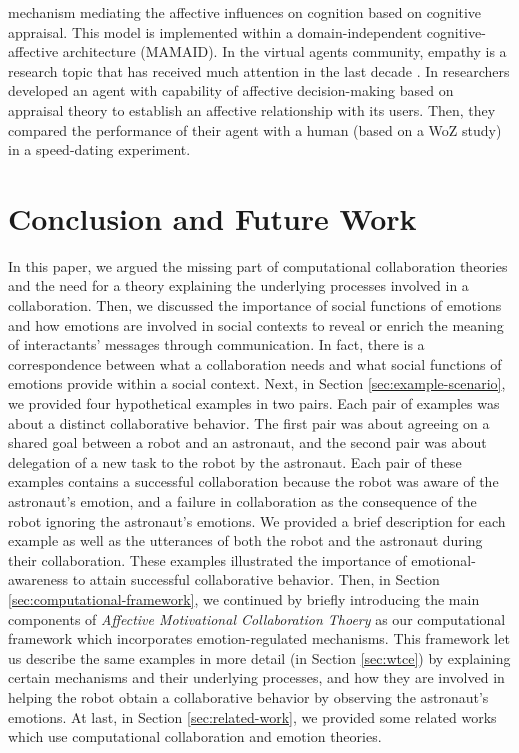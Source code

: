 mechanism mediating the affective influences on cognition based on cognitive
appraisal. This model is implemented within a domain-independent
cognitive-affective architecture (MAMAID). In the virtual agents community,
empathy is a research topic that has received much attention in the last decade
\cite{brave:emotion-hci} \cite{scott:modeling-empathy-agent}
\cite{paiva:agent-care} \cite{prendinger:empathic-companion}
\cite{bickmore:longterm-relationship}. In \cite{pontier:women-robot-men}
researchers developed an agent with capability of affective decision-making
based on appraisal theory to establish an affective relationship with its users.
Then, they compared the performance of their agent with a human (based on a WoZ
study) in a speed-dating experiment.

\section{Conclusion and Future Work}

In this paper, we argued the missing part of computational collaboration
theories and the need for a theory explaining the underlying processes involved
in a collaboration. Then, we discussed the importance of social functions of
emotions and how emotions are involved in social contexts to reveal or enrich
the meaning of interactants' messages through communication. In fact, there is a
correspondence between what a collaboration needs and what social functions of
emotions provide within a social context. Next, in Section
\ref{sec:example-scenario}, we provided four hypothetical examples in two pairs.
Each pair of examples was about a distinct collaborative behavior. The first
pair was about agreeing on a shared goal between a robot and an astronaut, and
the second pair was about delegation of a new task to the robot by the
astronaut. Each pair of these examples contains a successful collaboration
because the robot was aware of the astronaut's emotion, and a failure in
collaboration as the consequence of the robot ignoring the astronaut's
emotions. We provided a brief description for each example as well as the
utterances of both the robot and the astronaut during their collaboration. These
examples illustrated the importance of emotional-awareness to attain successful
collaborative behavior. Then, in Section \ref{sec:computational-framework}, we
continued by briefly introducing the main components of \textit{Affective
Motivational Collaboration Thoery} as our computational framework which
incorporates emotion-regulated mechanisms. This framework let us describe the
same examples in more detail (in Section \ref{sec:wtce}) by explaining certain
mechanisms and their underlying processes, and how they are involved in helping
the robot obtain a collaborative behavior by observing the astronaut's emotions.
At last, in Section \ref{sec:related-work}, we provided some related works which
use computational collaboration and emotion theories.

